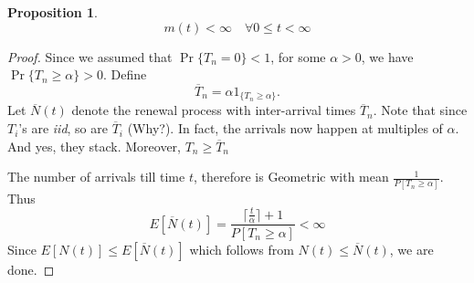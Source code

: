 \documentclass[a4paper,10pt]{article}
\theoremstyle{plain}
\newtheorem{prop}[thm]{Proposition}
\theoremstyle{definition}
\theoremstyle{remark}
\begin{document}
\begin{prop}
\begin{equation*} 
m(t) < \infty \quad \forall 0 \leq t < \infty
\end{equation*}
\end{prop}
\begin{proof}
Since we assumed that $\Pr\{T_n = 0\} < 1$, for some $\alpha > 0$, we have $\Pr\{T_n \geq \alpha\} >0$. Define
\begin{equation*}
\overline{T}_n = \alpha 1_{\{T_n \geq \alpha\}}.
\end{equation*}
Let $\overline{N}(t)$ denote the renewal process with inter-arrival times $\overline{T}_n$. Note that since $T_i$'s are \emph{iid}, so are $\overline{T}_i$ (Why?). In fact, the arrivals now happen at multiples of $\alpha$. And yes, they stack. Moreover, $T_n \geq \overline{T}_n$

The number of arrivals till time $t$, therefore is Geometric with mean $\frac{1}{P[T_n \geq \alpha]}$. Thus 
\begin{equation*}
E[\overline{N}(t)] = \frac{\lceil\frac{t}{\alpha} \rceil + 1}{P[T_n \geq \alpha]} < \infty
\end{equation*}
Since $E[N(t)] \leq E[\overline{N}(t)]$ which follows from $N(t) \leq \overline{N}(t)$, we are done.
\end{proof}
\end{document}

